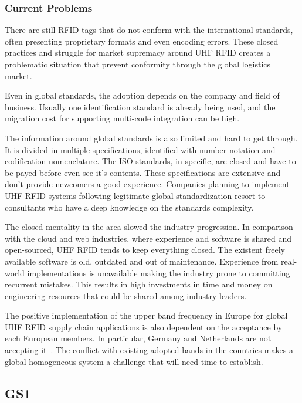 \subsubsection{Current Problems}

There are still \gls{RFID} tags that do not conform with the international standards, often presenting proprietary formats and even encoding errors.
These closed practices and struggle for market supremacy around \gls{UHF RFID} creates a problematic situation that prevent conformity through the global logistics market.

Even in global standards, the adoption depends on the company and field of business. Usually one identification standard is already being used, and the migration cost for supporting multi-code integration can be high.

The information around global standards is also limited and hard to get through. It is divided in multiple specifications, identified with number notation and codification nomenclature. 
The ISO standards, in specific, are closed and have to be payed before even see it's contents.
These specifications are extensive and don't provide newcomers a good experience. 
Companies planning to implement \gls{UHF RFID} systems following legitimate global standardization resort to consultants who have a deep knowledge on the standards complexity.

The closed mentality in the area slowed the industry progression. In comparison with the cloud and web industries, where experience and software is shared and open-sourced, \gls{UHF RFID} tends to keep everything closed. The existent freely available software is old, outdated and out of maintenance. Experience from real-world implementations is unavailable making the industry prone to committing recurrent mistakes. This results in high investments in time and money on engineering resources that could be shared among industry leaders.

The positive implementation of the upper band frequency in Europe for global \gls{UHF RFID} \gls{supply chain} applications is also dependent on the acceptance by each European members. In particular, Germany and Netherlands are not accepting it~\cite{EUUpperBand}. The conflict with existing adopted bands in the countries makes a global homogeneous system a challenge that will need time to establish.

\subsection{GS1}

